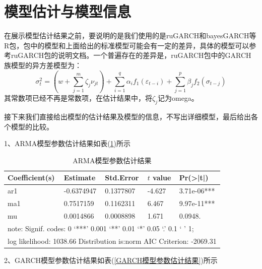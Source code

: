 \section{模型估计与模型信息}
    \par
    在展示模型估计结果之前，要说明的是我们使用的是ruGARCH和bayesGARCH等R包，包中的模型和上面给出的标准模型可能会有一定的差异，具体的模型可以参考ruGARCH包的说明文档。一个普遍存在的差异是，ruGARCH包中的GARCH族模型的异方差模型为：
    \[\sigma _t^2 = \left( {w + \sum\limits_{j = 1}^m {{\zeta _j}{\nu _{jt}}} } \right) + \sum\limits_{i = 1}^q {{\alpha _i}{f_1}\left( {{\varepsilon _{t - i}}} \right)}  + \sum\limits_{j = 1}^p {{\beta _j}{f_2}\left( {{\sigma _{t - j}}} \right)} \]
    其常数项已经不再是常数项，在估计结果中，将$\zeta_j$记为omega。
    \par
    接下来我们直接给出模型的估计结果及模型的信息，不写出详细模型，最后给出各个模型的比较。
    \par
    1、ARMA模型参数估计结果如表(\ref{ARMA模型参数估计结果})所示
        \begin{table}[H]
        \centering
        \caption{ARMA模型参数估计结果}
        \label{ARMA模型参数估计结果}
        \begin{tabular}{lllll}
            \toprule
            Coefficient(s)&  Estimate  &  Std.Error & $t$ value & Pr(>|t|)\\
        \midrule
        ar1& -0.6374947 & 0.1377807 &  -4.627 & 3.71e-06***\\
        ma1& 0.7517159  & 0.1162311 &  6.467  & 9.97e-11***\\
        mu & 0.0014866  & 0.0008898 &  1.671  & 0.0948.\\
        \bottomrule
        \multicolumn{5}{l}{\footnotesize note: Signif. codes: 0 ‘***’ 0.001 ‘**’ 0.01 ‘*’ 0.05 ‘.’ 0.1 ‘ ’ 1;}\\
        \multicolumn{5}{l}{\footnotesize log likelihood: 1038.66 Distribution is:norm AIC Criterion: -2069.31}\\
        \end{tabular}
        \end{table}
    \par
    2、GARCH模型参数估计结果如表(\ref{GARCH模型参数估计结果})所示
